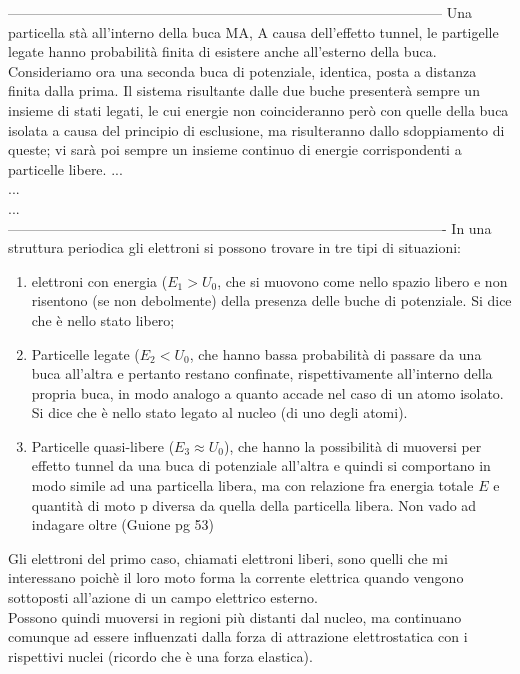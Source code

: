 ---------------------------------------------------------------------------------------------
Una particella stà all'interno della buca MA, A causa dell'effetto tunnel, le partigelle legate hanno probabilità finita di esistere anche all'esterno della buca.
Consideriamo ora una seconda buca di potenziale, identica, posta a distanza finita dalla prima. Il sistema risultante dalle due buche presenterà sempre un insieme di stati legati, le cui energie non coincideranno però con quelle della buca isolata a
causa del principio di esclusione, ma risulteranno dallo sdoppiamento di queste; vi
sarà poi sempre un insieme continuo di energie corrispondenti a particelle libere. 
...\\
...\\
...\\
----------------------------------------------------------------------------------------------
In una struttura periodica gli elettroni si possono trovare in tre tipi di situazioni:
\begin{enumerate}
    \item elettroni con energia ($E_1 > U_0$, che si muovono come nello spazio libero e non risentono (se non debolmente) della presenza delle buche di potenziale. Si dice che è nello stato libero;

    \item Particelle legate ($E_2 < U_0$, che hanno bassa probabilità di passare da una buca all'altra e pertanto restano confinate, rispettivamente all'interno della propria buca, in modo analogo a quanto accade nel caso di un atomo isolato. Si dice che è nello stato legato al nucleo (di uno degli atomi).

    \item Particelle quasi-libere ($E_3 \approx U_0$), che hanno la possibilità di muoversi per effetto tunnel da una buca di potenziale all'altra e quindi si comportano in modo simile ad una particella libera, ma con relazione fra energia totale $E$ e quantità di moto p diversa da quella della particella libera. Non vado ad indagare oltre (Guione pg 53)
\end{enumerate}
%
Gli elettroni del primo caso, chiamati elettroni liberi,  sono quelli che mi interessano poichè il loro moto forma la corrente elettrica quando vengono sottoposti all'azione di un campo elettrico esterno.\\
Possono quindi muoversi in regioni più distanti dal nucleo, ma continuano comunque ad essere influenzati dalla forza di attrazione elettrostatica con i rispettivi nuclei (ricordo che è una forza elastica).
